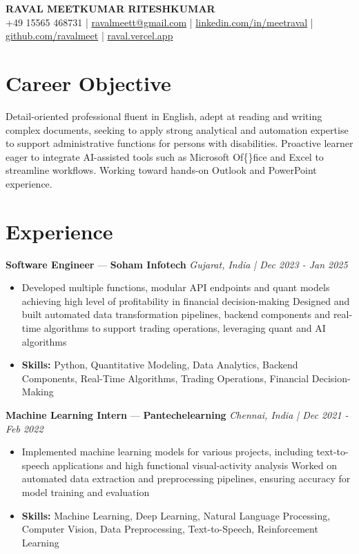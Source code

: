\documentclass[a4paper,10pt]{article}
\begin{document}
\begin{center}
  {\Large\bfseries RAVAL MEETKUMAR RITESHKUMAR}\\[2pt]
  {\small +49 15565 468731 \;|\; \href{mailto:ravalmeett@gmail.com}{ravalmeett@gmail.com} \;|\; \href{https://www.linkedin.com/in/meetraval/}{linkedin.com/in/meetraval} \;|\; \href{https://github.com/ravalmeet}{github.com/ravalmeet} \;|\; \href{https://raval.vercel.app/}{raval.vercel.app}}
\end{center}
\vspace{-3pt}

\section*{Career Objective}
Detail-oriented professional fluent in English, adept at reading and writing complex documents, seeking to apply strong analytical and automation expertise to support administrative functions for persons with disabilities. Proactive learner eager to integrate AI-assisted tools such as Microsoft Of\{\}fice and Excel to streamline workflows. Working toward hands-on Outlook and PowerPoint experience.\par

\section*{Experience}
\textbf{Software Engineer} — \textbf{Soham Infotech} \hfill \textit{Gujarat, India \;|\; Dec 2023 - Jan 2025}\par
\vspace{1pt}
\begin{itemize}
  \item Developed multiple functions, modular API endpoints and quant models achieving high level of profitability in financial decision-making Designed and built automated data transformation pipelines, backend components and real-time algorithms to support trading operations, leveraging quant and AI algorithms
  \item \textbf{Skills:} Python, Quantitative Modeling, Data Analytics, Backend Components, Real-Time Algorithms, Trading Operations, Financial Decision-Making
\end{itemize}
\vspace{3pt}
\textbf{Machine Learning Intern} — \textbf{Pantechelearning} \hfill \textit{Chennai, India \;|\; Dec 2021 - Feb 2022}\par
\vspace{1pt}
\begin{itemize}
  \item Implemented machine learning models for various projects, including text-to-speech applications and high functional visual-activity analysis Worked on automated data extraction and preprocessing pipelines, ensuring accuracy for model training and evaluation
  \item \textbf{Skills:} Machine Learning, Deep Learning, Natural Language Processing, Computer Vision, Data Preprocessing, Text-to-Speech, Reinforcement Learning
\end{itemize}
\end{document}
